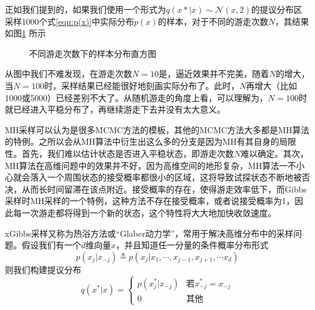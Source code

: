 正如我们提到的，如果我们使用一个形式为$q(x*|x)\sim \mathcal{N}(x, 2)$的提议分布区采样1000个式\eqref{equ:p(x)}中实际分布$p(x)$的样本，对于不同的游走次数$N$，其结果如图\ref{img:MH} 所示

\begin{figure}[htbp]
\centering
\subfigure{}\addtocounter{subfigure}{-2}
\subfigure{}\addtocounter{subfigure}{-2}
\subfigure{}\addtocounter{subfigure}{-2}
			\subfigure{}\addtocounter{subfigure}{-2}
\caption{不同游走次数下的样本分布直方图}
\label{img:MH}
\vspace{-1em}
\end{figure}

从图中我们不难发现，在游走次数$N=10$是，逼近效果并不完美，随着$N$的增大，当$N=100$时，采样结果已经能很好地刻画实际分布了。此时，$N$再增大（比如1000或5000）已经差别不大了。从随机游走的角度上看，可以理解为，$N=100$时就已经进入平稳分布了，再继续游走下去并没有太大意义。

MH采样可以认为是很多MCMC方法的模板，其他的MCMC方法大多都是MH算法的特例。之所以会从MH算法中衍生出这么多的分支是因为MH有其自身的局限性。首先，我们难以估计状态是否进入平稳状态，即游走次数$N$难以确定。其次，MH算法在高维问题中的效果并不好，因为高维空间的地形复杂，MH算法一不小心就会落入一个周围状态的接受概率都很小的区域，这将导致试探状态不断地被否决，从而长时间留滞在该点附近。接受概率的存在，使得游走效率低下，而Gibbs采样时MH采样的一个特例，这种方法不存在接受概率，或者说接受概率为1，因此每一次游走都将得到一个新的状态，这个特性将大大地加快收敛速度。

xGibbs采样又称为热浴方法或“Glaber动力学”，常用于解决高维分布中的采样问题。假设我们有一个$d$维向量$x$，并且知道任一分量的条件概率分布形式
\begin{equation}
p(x_j|x_{-j}) \triangleq p(x_j|x_1, \cdots, x_{j-1}, x_{j+1}, \cdots x_d)
\end{equation}
则我们构建提议分布
\begin{equation}\label{equ:GibbsQx}
q(x^*|x) = \left\{
\begin{array}{cc}
p(x^*_j|x_{-j}) & \text{若} x^*_{-j} = x_{-j}\\
0 & \text{其他}
\end{array}
\right.
\end{equation}


